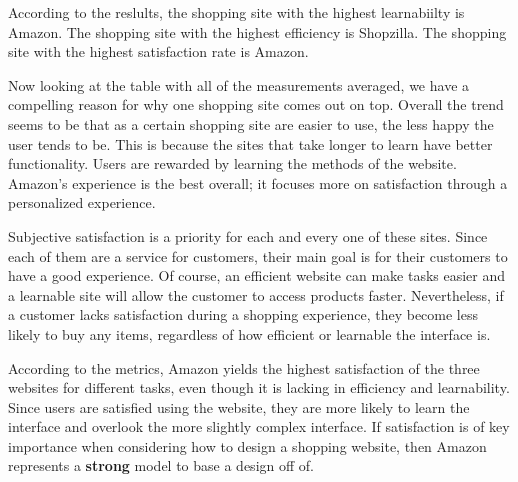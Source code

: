 \documentclass[11pt, oneside]{article}   	%
\begin{document}
According to the reslults, the shopping site with the highest learnabiilty is Amazon. The shopping site with the highest efficiency is Shopzilla. The shopping site with the highest satisfaction rate is Amazon.


Now looking at the table with all of the measurements averaged, we have a compelling reason for why one shopping site comes out on top. Overall the trend seems to be that as a certain shopping site are easier to use, the less happy the user tends to be. This is because the sites that take longer to learn have better functionality. Users are rewarded by learning the methods of the website. Amazon's experience is the best overall; it focuses more on satisfaction through a personalized experience.

Subjective satisfaction is a priority for each and every one of these sites. Since each of them are a service for customers, their main goal is for their customers to have a good experience. Of course, an efficient website can make  tasks easier and a learnable site will allow the customer to access products faster. Nevertheless, if a customer lacks satisfaction during a shopping experience, they become less likely to buy any items, regardless of how efficient or learnable the interface is. 

According to the metrics, Amazon yields the highest satisfaction of the three websites for different tasks, even though it is lacking in efficiency and learnability. Since users are satisfied using the website, they are more likely to learn the interface and overlook the more slightly complex interface. If satisfaction is of key importance when considering how to design a shopping website, then Amazon represents a \textbf{strong} model to base a design off of.

%
\end{document}

